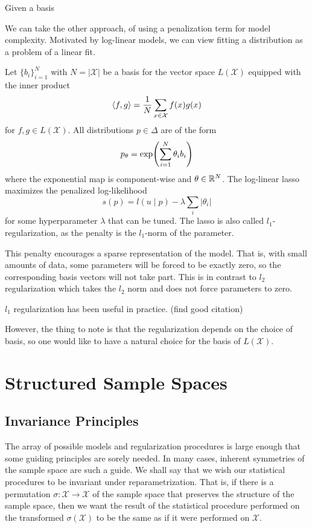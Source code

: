 \documentclass[cclicense]{hmcthesis}
\providecommand*{\xs}{\mathcal X}
\numberwithin{equation}{chapter}
\numberwithin{thmcounter}{chapter}
\begin{document}
    Given a basis

    We can take the other approach, of using a penalization term for model
    complexity.  Motivated by log-linear models, we can view fitting a
    distribution as a problem of a linear fit.

    Let $\{b_i\}_{i=1}^N$ with $N = |\xs|$ be a basis for the vector space
    $L(\xs)$ equipped with the inner product
    \[
        \adel{f, g} = \frac 1 N \sum_{x \in \xs} f(x) g(x)
    \]
    for $f, g \in L(\xs)$.  All distributions $p \in \Delta$ are of the form
    \[
        p_\theta = \exp\pdel*{\sum_{i=1}^N \theta_i b_i}
    \]
    where the exponential map is component-wise and $\theta \in \mathbb{R}^N$.  The
    log-linear lasso maximizes the penalized log-likelihood
    \[
        s(p) = l(u \mid p) - \lambda \sum_i |\theta_i|
    \]
    for some hyperparameter $\lambda$ that can be tuned.  The lasso is also
    called $l_1$-regularization, as the penalty is the $l_1$-norm of the
    parameter.

    This penalty encourages a sparse representation of the model.  That is, with
    small amounts of data, some parameters will be forced to be exactly zero, so
    the corresponding basis vectors will not take part.  This is in contrast to
    $l_2$ regularization which takes the $l_2$ norm and does not force
    parameters to zero.

    $l_1$ regularization has been useful in practice.  (find good citation)

    However, the thing to note is that the regularization depends on the choice
    of basis, so one would like to have a natural choice for the basis of
    $L(\xs)$.



\chapter{Structured Sample Spaces}

\section{Invariance Principles}
    
    The array of possible models and regularization procedures is large enough
    that some guiding principles are sorely needed.  In many cases, inherent
    symmetries of the sample space are such a guide.  We shall say that we wish
    our statistical procedures to be invariant under reparametrization.  That
    is, if there is a permutation $\sigma: \xs \to \xs$ of the sample space that
    preserves the structure of the sample space, then we want the result of the
    statistical procedure performed on the transformed $\sigma(\xs)$ to be the
    same as if it were performed on $\xs$.
\end{document}
